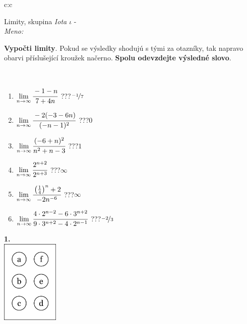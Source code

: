 \documentclass[10pt]{report}
\begin{document}
\begin{tabular}{c:c}
\begin{minipage}[c][104.5mm][t]{0.5\linewidth}
\begin{center}
\vspace{7mm}
{\huge Limity, skupina \textit{Iota $\iota$} -}\\[5mm]
\textit{Meno:}\phantom{xxxxxxxxxxxxxxxxxxxxxxxxxxxxxxxxxxxxxxxxxxxxxxxxxxxxxxxxxxxxxxxxx}\\[5mm]
\begin{minipage}{0.95\linewidth}
\begin{center}
\textbf{Vypočti limity}. Pokud se výsledky shodujú s tými za otazníky, tak napravo\\obarvi příslušející kroužek načerno. \textbf{Spolu odevzdejte výsledné slovo}.
\end{center}
\end{minipage}
\\[1mm]
\begin{minipage}{0.79\linewidth}
\begin{center}
\begin{varwidth}{\linewidth}
\begin{enumerate}
\normalsize
\item $\lim\limits_{n\to\infty}\cfrac{-1-n}{7+4n}$\quad \dotfill\; ???\;\dotfill \quad $\nicefrac{-1}{7}$
\item $\lim\limits_{n\to\infty}\cfrac{-2(-3-6n)}{(-n-1)^2}$\quad \dotfill\; ???\;\dotfill \quad $0$
\item $\lim\limits_{n\to\infty}\cfrac{(-6+n)^2}{n^2+n-3}$\quad \dotfill\; ???\;\dotfill \quad $1$
\item $\lim\limits_{n\to\infty}\cfrac{2^{n+2}}{2^{n+3}}$\quad \dotfill\; ???\;\dotfill \quad $\infty$
\item $\lim\limits_{n\to\infty}\cfrac{\left(\frac{1}{4}\right)^n +2}{-2n^{-6}}$\quad \dotfill\; ???\;\dotfill \quad $\infty$
\item $\lim\limits_{n\to\infty}\cfrac{4\cdot 2^{n-2}-6\cdot 3^{n+2}}{9\cdot 3^{n+2}-4\cdot 2^{n-1}}$\quad \dotfill\; ???\;\dotfill \quad $\nicefrac{-2}{3}$
\end{enumerate}
\end{varwidth}
\end{center}
\end{minipage}
\begin{minipage}{0.20\linewidth}
\begin{center}
{\Huge\bfseries 1.} \\[2mm]
\includegraphics[height=40mm]{../images/braille.png}

\end{center}
\end{minipage}
\end{center}
\end{minipage}
\end{tabular}
\end{document}
